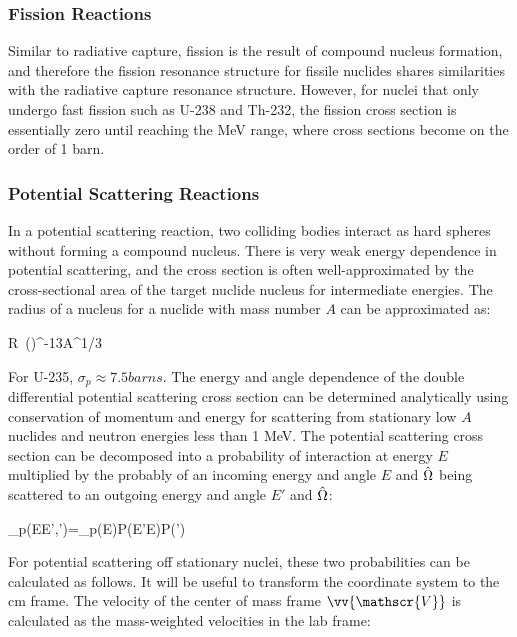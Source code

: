 \subsubsection{Fission Reactions}

Similar to radiative capture, fission is the result of compound nucleus formation, and therefore the fission resonance structure for fissile nuclides shares similarities with the radiative capture resonance structure. However, for nuclei that only undergo fast fission such as U-238 and Th-232, the fission cross section is essentially zero until reaching the MeV range, where cross sections become on the order of 1 barn.

\subsubsection{Potential Scattering Reactions}
\label{sec:PotentialScattering}

In a potential scattering reaction, two colliding bodies interact as hard spheres without forming a compound nucleus. There is very weak energy dependence in potential scattering, and the cross section is often well-approximated by the cross-sectional area of the target nuclide nucleus for intermediate energies. The radius of a nucleus for a nuclide with mass number \(A\) can be approximated as:

\beq
R\ ()^{-13}A^{1/3}
\eeq

For U-235, \(\sigma_p\approx7.5 barns\). The energy and angle dependence of the double differential potential scattering cross section can be determined analytically using conservation of momentum and energy for scattering from stationary low \(A\) nuclides and neutron energies less than 1 MeV. The potential scattering cross section can be decomposed into a probability of interaction at energy \(E\) multiplied by the probably of an incoming energy and angle \(E\) and \(\hat{\Omega}\) being scattered to an outgoing energy and angle \(E'\) and \(\hat{\Omega}\):

\beq
\label{eq:DifferentialSigma}
\sigma_p(E\rightarrow E',\hO\rightarrow\hO')=\sigma_p(E)P(E'\rightarrow E)P(\hO\rightarrow\hO')
\eeq


\label{sec:PotentialStationary}
For potential scattering off stationary nuclei, these two probabilities can be calculated as follows. It will be useful to transform the coordinate system to the \gls{cm} frame. The velocity of the center of mass frame \(\vv{\mathscr{V}}\) is calculated as the mass-weighted velocities in the lab frame:

